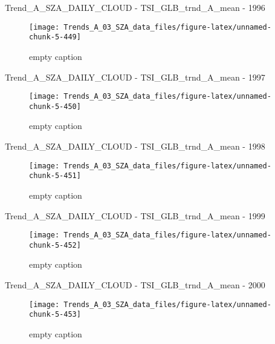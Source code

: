 \documentclass[
  10pt,
  a4paper,oneside]{article}
\begin{document}
Trend\_A\_SZA\_DAILY\_CLOUD - TSI\_GLB\_trnd\_A\_mean - 1996

\begin{figure}[!ht]

{\centering \texttt{[image: Trends\_A\_03\_SZA\_data\_files/figure-latex/unnamed-chunk-5-449]} 

}

\caption{ empty caption }\label{fig:unnamed-chunk-5-449}
\end{figure}

Trend\_A\_SZA\_DAILY\_CLOUD - TSI\_GLB\_trnd\_A\_mean - 1997

\begin{figure}[!ht]

{\centering \texttt{[image: Trends\_A\_03\_SZA\_data\_files/figure-latex/unnamed-chunk-5-450]} 

}

\caption{ empty caption }\label{fig:unnamed-chunk-5-450}
\end{figure}

Trend\_A\_SZA\_DAILY\_CLOUD - TSI\_GLB\_trnd\_A\_mean - 1998

\begin{figure}[!ht]

{\centering \texttt{[image: Trends\_A\_03\_SZA\_data\_files/figure-latex/unnamed-chunk-5-451]} 

}

\caption{ empty caption }\label{fig:unnamed-chunk-5-451}
\end{figure}

Trend\_A\_SZA\_DAILY\_CLOUD - TSI\_GLB\_trnd\_A\_mean - 1999

\begin{figure}[!ht]

{\centering \texttt{[image: Trends\_A\_03\_SZA\_data\_files/figure-latex/unnamed-chunk-5-452]} 

}

\caption{ empty caption }\label{fig:unnamed-chunk-5-452}
\end{figure}

Trend\_A\_SZA\_DAILY\_CLOUD - TSI\_GLB\_trnd\_A\_mean - 2000

\begin{figure}[!ht]

{\centering \texttt{[image: Trends\_A\_03\_SZA\_data\_files/figure-latex/unnamed-chunk-5-453]} 

}

\caption{ empty caption }\label{fig:unnamed-chunk-5-453}
\end{figure}
\end{document}
